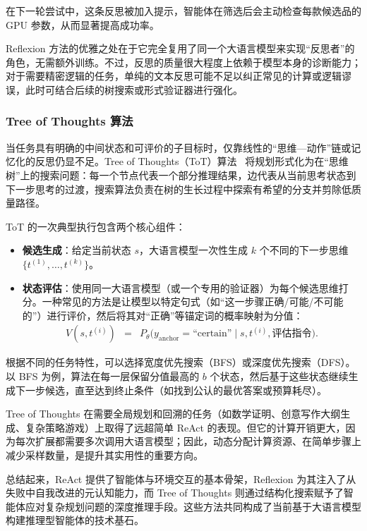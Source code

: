 \vspace{0.5em}


在下一轮尝试中，这条反思被加入提示，智能体在筛选后会主动检查每款候选品的 GPU 参数，从而显著提高成功率。

Reflexion 方法的优雅之处在于它完全复用了同一个大语言模型来实现“反思者”的角色，无需额外训练。不过，反思的质量很大程度上依赖于模型本身的诊断能力；对于需要精密逻辑的任务，单纯的文本反思可能不足以纠正常见的计算或逻辑谬误，此时可结合后续的树搜索或形式验证器进行强化。

\subsubsection{Tree of Thoughts 算法}

当任务具有明确的中间状态和可评价的子目标时，仅靠线性的“思维—动作”链或记忆化的反思仍显不足。Tree of Thoughts（ToT）算法~\cite{yao-etal:2023tree} 将规划形式化为在“思维树”上的搜索问题：每一个节点代表一个部分推理结果，边代表从当前思考状态到下一步思考的过渡，搜索算法负责在树的生长过程中探索有希望的分支并剪除低质量路径。

ToT 的一次典型执行包含两个核心组件：

\begin{itemize}
\item \textbf{候选生成}：给定当前状态 $s$，大语言模型一次性生成 $k$ 个不同的下一步思维 $\{t^{(1)}, \dots, t^{(k)}\}$。
\item \textbf{状态评估}：使用同一大语言模型（或一个专用的验证器）为每个候选思维打分。一种常见的方法是让模型以特定句式（如“这一步骤正确/可能/不可能的”）进行评价，然后将其对“正确”等锚定词的概率映射为分值：
\begin{eqnarray}
V(s, t^{(i)}) &=& P_\theta\bigl(y_{\mathrm{anchor}} = \text{``certain''} \mid s, t^{(i)}, \text{评估指令}\bigr).
\end{eqnarray}
\end{itemize}

根据不同的任务特性，可以选择宽度优先搜索（BFS）或深度优先搜索（DFS）。以 BFS 为例，算法在每一层保留分值最高的 $b$ 个状态，然后基于这些状态继续生成下一步候选，直至达到终止条件（如找到公认的最优答案或预算耗尽）。

Tree of Thoughts 在需要全局规划和回溯的任务（如数学证明、创意写作大纲生成、复杂策略游戏）上取得了远超简单 ReAct 的表现。但它的计算开销更大，因为每次扩展都需要多次调用大语言模型；因此，动态分配计算资源、在简单步骤上减少采样数量，是提升其实用性的重要方向。

\vspace{0.3cm}
总结起来，ReAct 提供了智能体与环境交互的基本骨架，Reflexion 为其注入了从失败中自我改进的元认知能力，而 Tree of Thoughts 则通过结构化搜索赋予了智能体应对复杂规划问题的深度推理手段。这些方法共同构成了当前基于大语言模型构建推理型智能体的技术基石。